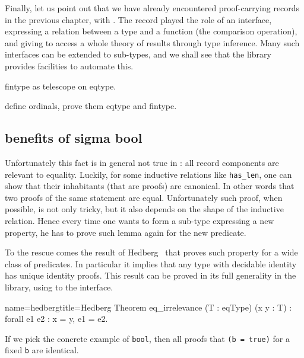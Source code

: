 Finally, let us point out that we have already encountered proof-carrying
records in the previous chapter, with .
The  record played the role of an interface,
expressing a relation between a type and a function (the comparison operation),
and giving to access a whole theory of results through type inference.
Many such interfaces can be extended to sub-types, and we shall see that
the \mcbMC{} library provides facilities to automate this.

\mcbLEARN{}
\mcbNOTES{}

fintype as telescope on eqtype.

define ordinals, prove them eqtype and fintype.

\subsection{benefits of sigma bool}


Unfortunately this fact is in general not true in \mcbCIC{}: all
record components are relevant to equality.
Luckily, for some inductive relations like \lstinline/has_len/, one
can show that their inhabitants (that are proofs) are canonical.  In
other words that two proofs of the same statement are equal.
Unfortunately such proof, when possible, is not only tricky, but
it also depends on the shape of the inductive relation.  Hence every
time one wants to form a sub-type expressing a new property, he has to
prove such lemma again for the new predicate.

To the rescue comes the result of Hedberg~\cite{Hedberg}
that proves such property for a wide class of predicates.
In particular it implies that any type with decidable identity
has unique identity proofs. This result can be proved in its full generality
in the \mcbMC{} library, using to the  interface.

\begin{coq}{name=hedberg}{title=Hedberg}
Theorem eq_irrelevance (T : eqType) (x y : T) : forall e1 e2 : x = y, e1 = e2.
\end{coq}

If we pick the concrete example of \lstinline/bool/,
then all proofs that \lstinline/(b = true)/
for a fixed \lstinline/b/ are identical.



